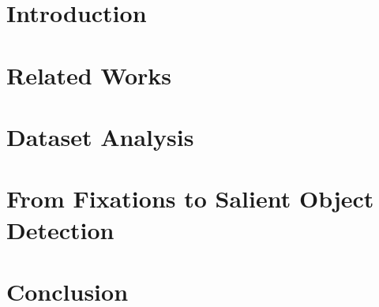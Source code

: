 \def\memonumber{ \textsf{014}} %
\def\memodate{\textsf{\today}} %
\def\memotitle{\textsf{The Secrets of Salient Object Segmentation}} %
\def\memoauthors{\textsf{Yin Li$^{1*}$, Xiaodi Hou$^{2*}$\let\thefootnote\relax\footnote{* These authors contribute equally.}, Christof Koch$^{3}$, James M. Rehg$^{1}$, Alan L. Yuille$^{4}$ }\\
$^{1}$Gerogia Institute of Technology~~
$^{2}$California Institute of Technology \\
$^{3}$Allen Institute for Brain Science ~~
$^{4}$University of California, Los Angeles\\
{\tt\small yli440@gatech.edu~xiaodi.hou@gmail.com~christofk@alleninstitute.org~rehg@cc.gatech.edu~yuille@stat.ucla.edu}}%

\def\memoabstract{\textsf{In this paper we provide an extensive evaluation of fixation prediction and salient object segmentation algorithms as well as statistics of major datasets. Our analysis identifies serious design flaws of existing salient object benchmarks, called the \emph{dataset design bias}, by over emphasising the stereotypical concepts of saliency. The dataset design bias does not only create the discomforting disconnection between fixations and salient object segmentation, but also misleads the algorithm designing.
Based on our analysis, we propose a new high quality dataset that offers both fixation and salient object segmentation ground-truth. With fixations and salient object being presented simultaneously,  we are able to bridge the gap between fixations and salient objects, and propose a novel method for salient object segmentation. Finally, we report significant benchmark progress on three existing datasets of segmenting salient objects. \\
}}%

\titleAT %
\clearpage

\section{Introduction}

\section{Related Works}\label{sec:relatedWorks}

\section{Dataset Analysis}\label{sec:dataset}

\section{From Fixations to Salient Object Detection}\label{sec:model}

\section{Conclusion}


{


}




